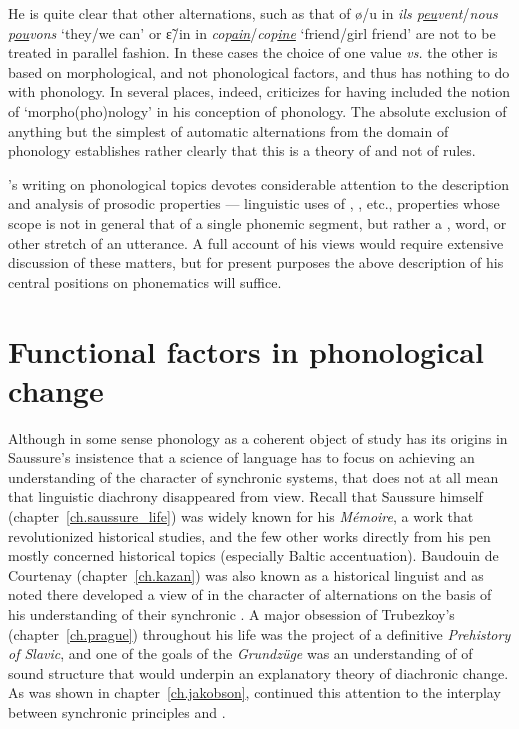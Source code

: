 He is quite clear that other alternations, such as that of ø/u in
\emph{ils p\underline{eu}vent}/\emph{nous p\underline{ou}vons}
`they/we can' or ɛ̃/in in
\emph{cop\underline{ain}}/\emph{cop\underline{ine}} `friend/girl
friend' are not to be treated in parallel fashion. In these cases the
choice of one value \emph{vs.} the other is based on morphological,
and not phonological factors, and thus has nothing to do with
phonology. In several places, indeed, {\Martinet} criticizes {\Trubetzkoy}
for having included the notion of `morpho(pho)nology' in his conception
of phonology. The absolute exclusion of anything but the simplest of
automatic alternations from the domain of phonology establishes rather
clearly that this is a theory of  and not of rules.

{\Martinet}'s writing on phonological topics devotes considerable
attention to the description and analysis of prosodic properties ---
linguistic uses of , , etc., properties whose scope is not
in general that of a single phonemic segment, but rather a ,
word, or other stretch of an utterance.  A full account of his views
would require extensive discussion of these matters, but for present
purposes the above description of his central positions on phonematics
will suffice.


\section{Functional factors in phonological change}
\label{sec:economie}

Although in some sense phonology as a coherent object of study has its
origins in Saussure's insistence that a science of language has to
focus on achieving an understanding of the character of synchronic
systems, that does not at all mean that linguistic diachrony
disappeared from view. Recall that Saussure himself
(chapter~\ref{ch.saussure_life}) was widely known for his
\textsl{Mémoire}, a work that revolutionized historical 
studies, and the few other works directly from his pen mostly
concerned historical topics (especially Baltic accentuation). Baudouin
de Courtenay (chapter~\ref{ch.kazan}) was also known as a historical
linguist and as noted there developed a view of  in
the character of alternations on the basis of his understanding of
their synchronic . A major obsession of Trubezkoy's
(chapter~\ref{ch.prague}) throughout his life was the project of a
definitive \textsl{Prehistory of Slavic}, and one of the goals of the
\textsl{Grundzüge} was an understanding of  of sound
structure that would underpin an explanatory theory of diachronic
change. As was shown in chapter~\ref{ch.jakobson}, {\Jakobson} continued this attention to
the interplay between synchronic principles and .

